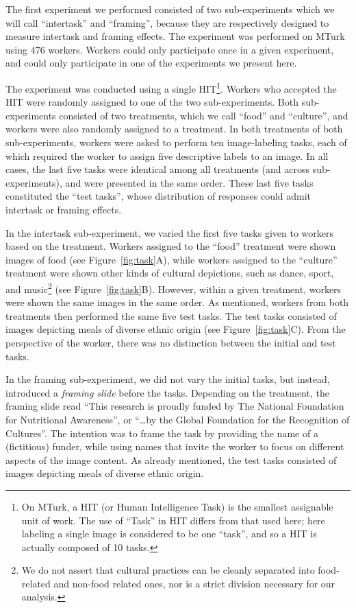 \documentclass{sigchi}
\begin{document}
The first experiment we performed consisted of two sub-experiments which
we will call ``intertask'' and ``framing'', because they are respectively
designed to measure intertask and framing effects.  The experiment was 
performed on MTurk using 476 workers.  Workers
could only participate once in a given experiment, and could only 
participate in one of the experiments we present here.

The experiment was conducted using a single HIT\footnote{
  On MTurk, a HIT (or Human Intelligence Task) is the smallest 
  assignable unit of work.  The use of ``Task'' in HIT differs from that
  used here; here labeling a single image is considered to be one ``task'',
  and so a HIT is actually composed of 10 tasks.
}.  Workers who accepted the HIT were randomly assigned to one of the two
sub-experiments.  Both sub-experiments consisted of two treatments, which
we call ``food'' and ``culture'', and workers were also randomly 
assigned to a treatment.  In both treatments of both sub-experiments,
workers were asked to perform ten image-labeling tasks, each of which 
required the worker to assign five descriptive labels to an image.  
In all cases, the last five tasks were identical among all treatments 
(and across sub-experiments), and were presented in the same order.  
These last five tasks constituted the ``test tasks'', whose distribution
of responses could admit intertask or framing effects.

In the intertask sub-experiment, we varied the first five tasks given to 
workers based on the treatment.  Workers assigned to the ``food'' 
treatment were shown images of food (see Figure~\ref{fig:task}A), 
while workers assigned to the ``culture'' treatment were shown other kinds 
of cultural depictions, such as dance, sport, and 
music\footnote{
  We do not assert that cultural practices can be cleanly separated into 
  food-related and non-food related ones, nor is a strict division 
  necessary for our analysis.
} (see Figure~\ref{fig:task}B).  
However, within a given treatment, workers were shown the same images in
the same order.  As mentioned, workers 
from both treatments then performed the same five test tasks.  The test
tasks consisted of images depicting meals of diverse ethnic origin
(see Figure~\ref{fig:task}C).
From the perspective of the worker, there was no distinction between the 
initial and test tasks.

In the framing sub-experiment, we did not vary the initial tasks, but 
instead, introduced a \textit{framing slide} before the tasks.  
Depending on the treatment, the framing slide read 
``This research is proudly funded by The National Foundation for 
Nutritional Awareness'', or ``\ldots by the Global Foundation for the 
Recognition of Cultures''.  The intention was to frame the task by
providing the name of a (fictitious) funder, while using names that
invite the worker to focus on different aspects of the image content.  
As already mentioned, the test tasks consisted of images depicting meals 
of diverse ethnic origin.
\end{document}
